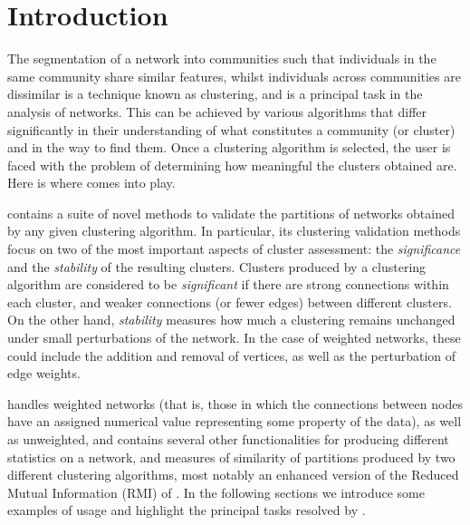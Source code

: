 \section{Introduction}


The segmentation of a network into communities such that individuals in the same community share similar features, whilst individuals across communities are dissimilar is a technique known as clustering, and is a principal task in the analysis of networks. This can be achieved by various algorithms that differ significantly in their understanding of what constitutes a community (or cluster) and in the way to find them. 
Once a clustering algorithm is selected, the user is faced with the problem of 
 determining how meaningful the clusters obtained are. Here is where  comes into play. 
 
  contains a suite of 
novel methods to validate the  partitions  of  networks obtained by any given clustering algorithm. 
In particular, its clustering validation methods focus on two of the most important aspects of cluster assessment: the {\em significance} and the {\em stability} of the resulting clusters.
Clusters produced by a clustering algorithm are considered to be {\em significant} if there are  strong connections within each cluster, and weaker connections (or fewer edges) between different clusters. 
On the other hand, {\em stability} measures how much a clustering remains unchanged under small perturbations of the network. In the case of weighted networks, these could include the addition and removal of vertices, as well as the perturbation of edge weights. 

 handles weighted networks (that is, those in which the connections between nodes have an assigned numerical value representing some property of the data), as well as unweighted, and contains several other functionalities for producing different statistics on a network, and measures of similarity of partitions produced by two different clustering algorithms, most notably an enhanced version of the Reduced Mutual Information (RMI) of \cite{corrected_MI_Newman2020}.
In the following sections we introduce some examples of usage and highlight the principal tasks resolved by .

